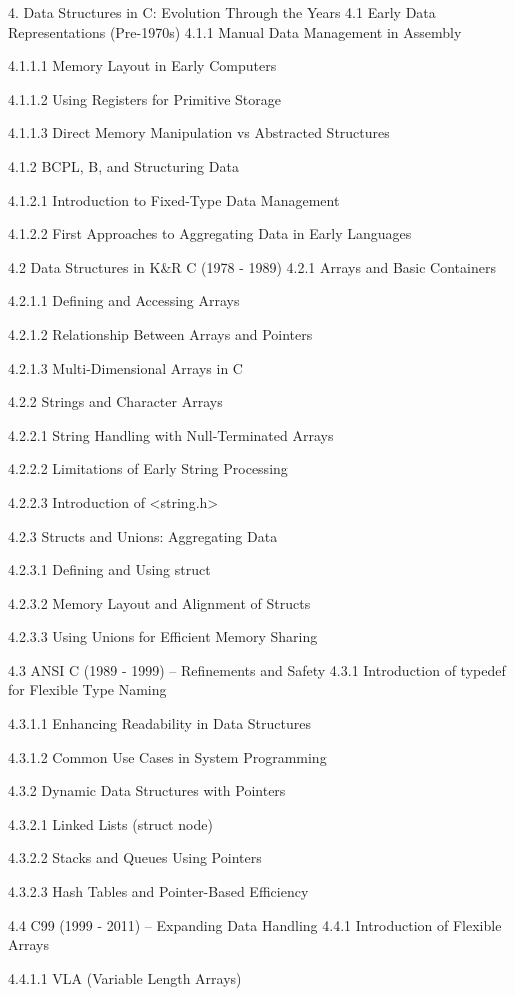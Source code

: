 4. Data Structures in C: Evolution Through the Years
4.1 Early Data Representations (Pre-1970s)
4.1.1 Manual Data Management in Assembly

4.1.1.1 Memory Layout in Early Computers

4.1.1.2 Using Registers for Primitive Storage

4.1.1.3 Direct Memory Manipulation vs Abstracted Structures

4.1.2 BCPL, B, and Structuring Data

4.1.2.1 Introduction to Fixed-Type Data Management

4.1.2.2 First Approaches to Aggregating Data in Early Languages

4.2 Data Structures in K&R C (1978 - 1989)
4.2.1 Arrays and Basic Containers

4.2.1.1 Defining and Accessing Arrays

4.2.1.2 Relationship Between Arrays and Pointers

4.2.1.3 Multi-Dimensional Arrays in C

4.2.2 Strings and Character Arrays

4.2.2.1 String Handling with Null-Terminated Arrays

4.2.2.2 Limitations of Early String Processing

4.2.2.3 Introduction of <string.h>

4.2.3 Structs and Unions: Aggregating Data

4.2.3.1 Defining and Using struct

4.2.3.2 Memory Layout and Alignment of Structs

4.2.3.3 Using Unions for Efficient Memory Sharing

4.3 ANSI C (1989 - 1999) – Refinements and Safety
4.3.1 Introduction of typedef for Flexible Type Naming

4.3.1.1 Enhancing Readability in Data Structures

4.3.1.2 Common Use Cases in System Programming

4.3.2 Dynamic Data Structures with Pointers

4.3.2.1 Linked Lists (struct node)

4.3.2.2 Stacks and Queues Using Pointers

4.3.2.3 Hash Tables and Pointer-Based Efficiency

4.4 C99 (1999 - 2011) – Expanding Data Handling
4.4.1 Introduction of Flexible Arrays

4.4.1.1 VLA (Variable Length Arrays)

